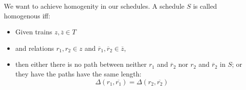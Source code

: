 \documentclass{article} %
\newcommand{\ol}[1]{\overline{#1}}
\begin{document}
We want to achieve homogenity in our schedules.  A schedule \(S\) is called
homogenous iff:
\begin{itemize}
\item Given trains \(z, \ol{z} \in T\)
\item and relations \(r_1, r_2 \in z\) and \(\ol{r}_1,\ol{r}_2 \in \ol{z}\),
\item then either there is no path between neither \(r_1\) and
  \(\ol{r}_2\) nor \(r_2\) and \(\ol{r}_2\) in \(S\); or they have the paths have the same length:
\begin{equation}
\label{homoEq}
  \Delta (r_1, \ol{r_1}) = \Delta (r_2, \ol{r_2})
\end{equation}
\end{itemize}







\end{document}
